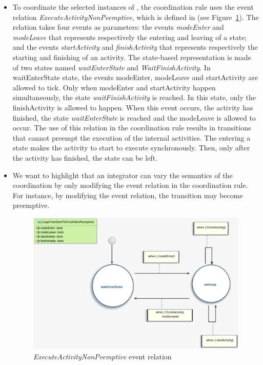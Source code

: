 \begin{itemize}
	 \item To coordinate the selected instances of \dse, the coordination rule uses the event relation \emph{ExecuteActivityNonPeemptive}, which is defined in \moccml (see Figure~\ref{fig:looprelation}). The relation takes four events as parameters: the events \emph{modeEnter} and \emph{modeLeave} that represents respectively the entering and leaving of a state; and the events \emph{startActivity} and \emph{finishActivity} that represents respectively the starting and finishing of an activity. The state-based representation is made of two states named \emph{waitEnterState} and \emph{WaitFinishActivity}. In waitEnterState state, the events modeEnter, modeLeave and startActivity are allowed to tick. Only when modeEnter and startActivity happen simultaneously, the state \emph{waitFinishActivity} is reached. In this state, only the finishActivity is allowed to happen. When this event occurs, \ie the activity has finished, the state \emph{waitEnterState} is reached and the modeLeave is allowed to occur. The use of this relation in the coordination rule results in transitions that cannot preempt the execution of the internal activities. The entering a state makes the activity to start to execute synchronously. Then, only after the activity has finished, the state can be left.
	 
	 \item We want to highlight that an integrator can vary the semantics of the coordination by only modifying the event relation in the coordination rule. For instance, by modifying the event relation, the transition may become preemptive.
	 
	 \begin{figure}[h]
	 	\center
	 	\includegraphics[width=.7\columnwidth]{examples/figs/LoopFromStartToFinishNonPreemptive}
	 	\caption{\emph{ExecuteActivityNonPeemptive} event relation}
	 	\label{fig:looprelation}
	 \end{figure}
	 

\end{itemize}
